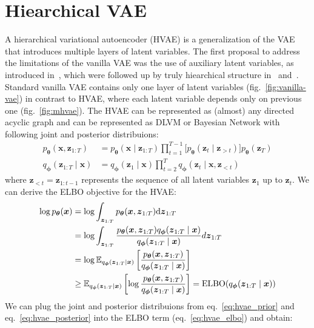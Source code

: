 \section{Hiearchical VAE} \label{sec:hiearchical-vae}
A hierarchical variational autoencoder (HVAE) is a generalization of the VAE that introduces multiple layers of latent variables.
The first proposal to address the limitations of the vanilla VAE was the use of auxiliary latent variables, as introduced in~\cite{aux-var-2016},
which were followed up by truly hiearchical structure in~\cite{lvae-2016} and~\cite{iaf-2016}. Standard vanilla VAE contains only one layer
of latent variables (fig.~\ref{fig:vanilla-vae}) in contrast to HVAE, where each latent variable depends only on previous one
(fig.~\ref{fig:mhvae}). The HVAE can be represented as (almost) any directed acyclic graph and can be represented as DLVM or Bayesian Network with 
following joint and posterior distribuions:
\begin{align}
    p_{\boldsymbol{\theta}}(\boldsymbol{x},\boldsymbol{z}_{1:T})&=p_{\boldsymbol{\theta}}(\boldsymbol{x}\mid\boldsymbol{z}_{1:T}) \prod_{t=1}^{T-1}\bigl[p_{\boldsymbol{\theta}}(\boldsymbol{z}_{t}\mid\boldsymbol{z}_{>t}) \bigr]  p_{\boldsymbol{\theta}}(\boldsymbol{z}_{T}) \label{eq:hvae_prior} \\
    q_{\boldsymbol{\phi}}(\boldsymbol{z}_{1:T}\mid\boldsymbol{x}) &= q_{\boldsymbol{\phi}}(\boldsymbol{z}_{1}\mid\boldsymbol{x}) \prod_{t=2}^{T}  q_{\boldsymbol{\phi}}(\boldsymbol{z}_{t}\mid \boldsymbol{x},\boldsymbol{z}_{<t}) \label{eq:hvae_posterior}
\end{align}
where $\boldsymbol{z}_{<t} = \boldsymbol{z}_{1:t-1}$ represents the sequence of all latent variables $\boldsymbol{z}_1$ up to $\boldsymbol{z}_t$. 
We can derive the ELBO objective for the HVAE: 
\begin{align}
    \log p_{\boldsymbol{\theta}}(\boldsymbol{x}) &= \log \int_{\boldsymbol{z}_{1:T}} p_{\boldsymbol{\theta}}(\boldsymbol{x},\boldsymbol{z}_{1:T}) \mbox{\rm d}\boldsymbol{z}_{1:T} \notag\\
    &= \log \int_{\boldsymbol{z}_{1:T}} \frac{p_{\boldsymbol{\theta}}(\boldsymbol{x}, \boldsymbol{z}_{1:T})q_{\boldsymbol{\phi}}(\boldsymbol{z}_{1:T}\mid \boldsymbol{x})}{q_{\boldsymbol{\phi}}(\boldsymbol{z}_{1:T}\mid\boldsymbol{x})} d\boldsymbol{z}_{1:T} \notag \\
    &= \log \operatorname{\mathbb{E}}_{q_{\boldsymbol{\phi}}(\boldsymbol{z}_{1:T}\mid\boldsymbol{x})} \left[\frac{p_{\boldsymbol{\theta}}(\boldsymbol{x}, \boldsymbol{z}_{1:T})}{q_{\boldsymbol{\phi}}(\boldsymbol{z}_{1:T}\mid\boldsymbol{x})}\right] \notag\\
    &\geq \mathbb{E}_{q_{\boldsymbol{\phi}}(\boldsymbol{z}_{1:T}\mid\boldsymbol{x})}\left[\log \frac{p_{\boldsymbol{\theta}}(\boldsymbol{x}, \boldsymbol{z}_{1:T})}{q_{\boldsymbol{\phi}}(\boldsymbol{z}_{1:T}\mid\boldsymbol{x})}\right]  = \mathrm{ELBO}(q_{\boldsymbol{\phi}}(\boldsymbol{z}_{1:T}\mid\boldsymbol{x})) \label{eq:hvae_elbo}
\end{align}
We can plug the joint and posterior distribuions from eq.~\ref{eq:hvae_prior} and  eq.~\ref{eq:hvae_posterior} into the ELBO term (eq.~\ref{eq:hvae_elbo}) and obtain:

